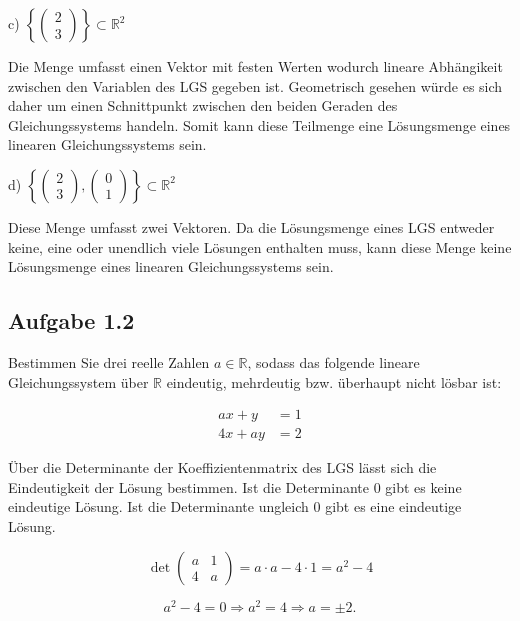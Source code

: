 \documentclass[11pt]{article}
\begin{document}
    \bigskip
    c)    $\left\{ \begin{pmatrix} 2 \\ 3 \end{pmatrix} \right\} \subset \mathbb{R}^2$
    \bigskip

    Die Menge umfasst einen Vektor mit festen Werten wodurch lineare Abhängikeit zwischen den Variablen des LGS gegeben ist.
    Geometrisch gesehen würde es sich daher um einen Schnittpunkt zwischen den beiden Geraden des Gleichungssystems handeln.
    Somit kann diese Teilmenge eine Lösungsmenge eines linearen Gleichungssystems sein.

    \bigskip
    d)    $\left\{ \begin{pmatrix} 2 \\ 3 \end{pmatrix}, \begin{pmatrix} 0 \\ 1 \end{pmatrix} \right\} \subset \mathbb{R}^2$
    \bigskip

    Diese Menge umfasst zwei Vektoren. Da die Lösungsmenge eines LGS entweder keine, eine oder unendlich viele Lösungen enthalten muss, kann diese Menge keine Lösungsmenge eines linearen Gleichungssystems sein.

    \subsection{Aufgabe 1.2}
    Bestimmen Sie drei reelle Zahlen $a \in \mathbb{R}$, sodass das folgende lineare Gleichungssystem über $\mathbb{R}$ eindeutig, mehrdeutig bzw. überhaupt nicht lösbar ist:

    \[
    \begin{aligned}
        ax + y & = 1 \\
        4x + ay & = 2
    \end{aligned}
    \]

    Über die Determinante der Koeffizientenmatrix des LGS lässt sich die Eindeutigkeit der Lösung bestimmen. Ist die
    Determinante 0 gibt es keine eindeutige Lösung. Ist die Determinante ungleich 0 gibt es eine eindeutige Lösung.

    \[
    \det\begin{pmatrix}
        a & 1 \\
        4 & a
    \end{pmatrix} = a \cdot a - 4 \cdot 1 = a^2 - 4
    \]

    \[
        a^2 - 4 = 0 \Rightarrow a^2 = 4 \Rightarrow a = \pm 2.
    \]
\end{document}
